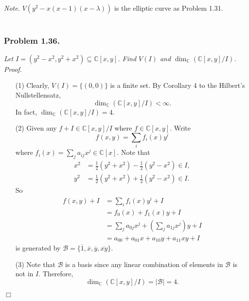 \documentclass{article}
\begin{document}
\emph{Note.}
  $V(y^2-x(x-1)(x-\lambda))$ is the elliptic curve as Problem 1.31. \\\\






\subsubsection*{Problem 1.36.}
\emph{Let $I = (y^2-x^2, y^2+x^2) \subseteq \mathbb{C}[x,y]$.
Find $V(I)$ and $\dim_{\mathbb{C}}(\mathbb{C}[x,y]/I)$.} \\

\emph{Proof.}
\begin{enumerate}
\item[(1)]
  Clearly, $V(I) = \{ (0,0) \}$ is a finite set.
  By Corollary 4 to the Hilbert's Nullstellensatz,
  \[
    \dim_{\mathbb{C}}(\mathbb{C}[x,y]/I) < \infty.
  \]
  In fact, $\dim_{\mathbb{C}}(\mathbb{C}[x,y]/I) = 4$.

\item[(2)]
  Given any $f + I \in \mathbb{C}[x,y]/I$ where $f \in \mathbb{C}[x,y]$.
  Write
  \[
    f(x,y) = \sum_{i} f_i(x) y^i
  \]
  where $f_i(x) = \sum_{j} a_{ij} x^{j} \in \mathbb{C}[x]$.
  Note that
  \begin{align*}
    x^2 &= \frac{1}{2}(y^2+x^2) - \frac{1}{2}(y^2-x^2) \in I, \\
    y^2 &= \frac{1}{2}(y^2+x^2) + \frac{1}{2}(y^2-x^2) \in I.
  \end{align*}
  So
  \begin{align*}
    f(x,y) + I
    &= \sum_{i} f_i(x) y^i + I \\
    &= f_0(x) + f_1(x) y + I \\
    &= \sum_{j} a_{0j} x^{j} + \left(\sum_{j} a_{1j} x^{j}\right) y + I \\
    &= a_{00} + a_{01} x + a_{10} y + a_{11} xy + I
  \end{align*}
  is generated by $\mathscr{B} = \{ \overline{1}, \overline{x}, \overline{y}, \overline{xy} \}$.

\item[(3)]
  Note that $\mathscr{B}$ is a basis
  since any linear combination of elements in $\mathscr{B}$ is not in $I$.
  Therefore,
  \[
    \dim_{\mathbb{C}}(\mathbb{C}[x,y]/I) = |\mathscr{B}| = 4.
  \]
\end{enumerate}
$\Box$ \\\\
\end{document}
